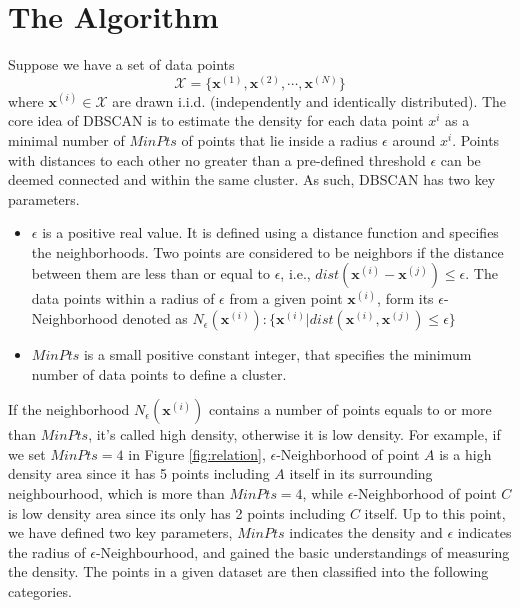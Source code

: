 \section{The Algorithm}

Suppose we have a set of data points \[\mathcal{X} = 
\{\mathbf{x}^{(1)},\mathbf{x}^{(2)},\cdots,\mathbf{x}^{(N)}\}\]
\noindent where $\mathbf{x}^{(i)} \in \mathcal{X}$ are drawn i.i.d. 
(independently and identically distributed).  The core idea of DBSCAN is to 
estimate the density for each data point $x^{i}$ as a minimal number of 
$MinPts$ of points that lie inside a radius $\epsilon$ around $x^{i}$. 
Points with distances to each other no greater than a pre-defined threshold $\epsilon$ can be deemed connected and within the same cluster.
As such, DBSCAN has two key parameters. 

\begin{itemize}
	\item{$\epsilon$} is a positive real value. It is defined using a distance 
	function and specifies the neighborhoods. Two points are considered to be 
	neighbors if the distance between them are less than or equal to 
	$\epsilon$, i.e., $dist(\mathbf{x}^{(i)} - \mathbf{x}^{(j)}) \leq \epsilon$. The data 
	points within a radius of $\epsilon$ from a given point $\mathbf{x}^{(i)}$, 
	form its $\epsilon$-Neighborhood denoted as 
	$\mathit{N_{\epsilon}(\mathbf{x}^{(i)}):\{\mathbf{x}^{(i)}| 
	dist(\mathbf{x}^{(i)}, \mathbf{x}^{(j)})\leq \epsilon\}}$
	
	\item{$MinPts$} is a small positive constant integer, that specifies the 
	minimum number of data points to define a cluster.	
\end{itemize}

If the neighborhood $N_{\epsilon}(\mathbf{x}^{(i)})$ contains a number of points equals to or more than $MinPts$, it's called high density, otherwise it is low density. For example, 
if we set $MinPts = 4$ in Figure \ref{fig:relation}, 
$\epsilon$-Neighborhood of point $A$ is a high density area since it has 5 
points including $A$ itself in its surrounding neighbourhood, which is more 
than $MinPts = 4$, while $\epsilon$-Neighborhood of point $C$ is low density 
area since its only has 2 points including $C$ itself. Up to this point, we have defined two key parameters, $MinPts$ indicates the  density and $\epsilon$ indicates the radius of $\epsilon$-Neighbourhood, and  gained the 
basic understandings of measuring the density. The points in a given dataset 
are then classified into the following categories. 


